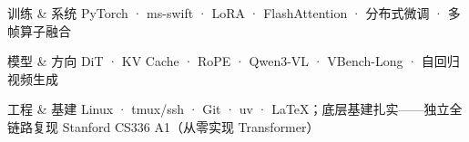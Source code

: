 \vspace{-2mm}
\begin{cvskills}
  \cvskill
    {训练 \& 系统} %
    {PyTorch · ms-swift · LoRA · FlashAttention · 分布式微调 · 多帧算子融合}

  \cvskill
    {模型 \& 方向} %
    {DiT · KV Cache · RoPE · Qwen3-VL · VBench-Long · 自回归视频生成}

  \cvskill
    {工程 \& 基建} %
    {Linux · tmux/ssh · Git · uv · LaTeX；底层基建扎实——独立全链路复现 Stanford CS336 A1（从零实现 Transformer）}
\end{cvskills}
